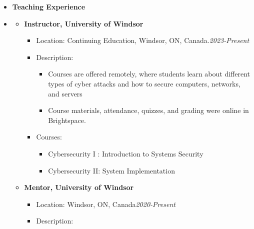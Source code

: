 
\begin {itemize} \item [] {\bf \Large   Teaching Experience }  \vspace{-1.5em}
\item []  {\bf \hrulefill } \mdseries \normalsize 
    \begin {itemize}
        \item [$\bullet$] \bf {\mtf \normalsize  Instructor,  University of Windsor} \mdseries
            \begin {itemize}
                \item [-]  {  Location: Continuing Education, Windsor, ON, Canada.\small \hspace{2.1cm}\textit{2023-Present}\normalsize} 
                \item [-]   {   Description:} 
                    \begin {itemize}   
                        \item [\textbullet] Courses are offered remotely, where students learn about different types of cyber attacks and how to secure computers, networks, and servers
                        \item [\textbullet] Course materials, attendance, quizzes, and grading were online in Brightspace.
                    \end {itemize}
                    \item [-]   {   Courses:} 
                    \begin {itemize}   
                        \item [\textbullet]  Cybersecurity I : Introduction to Systems Security 
                        \item [\textbullet] Cybersecurity II: System Implementation
                    \end {itemize}
            \end {itemize} \vspace{0.3cm}
     \item [$\bullet$] \bf {\mtf \normalsize Mentor, University of Windsor} \mdseries
            \begin {itemize}
                \item [-]  {  Location:  Windsor, ON, Canada\small \hspace{5.8cm}\textit{2020-Present}\normalsize} 
                \item [-]   {   Description:} 
                    \begin {itemize}

\end{itemize}
\end{itemize}
\end{itemize}
\end{itemize}
